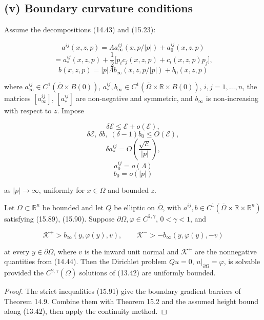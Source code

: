 \medskip

\subsection*{(v) Boundary curvature conditions}
Assume the decompositions (14.43) and (15.23):

\[
a^{ij}(x,z,p)=\Lambda a_\infty^{ij}(x,p/|p|)+a_0^{ij}(x,z,p)
\]
\[
\tag{15.89}
= a_*^{ij}(x,z,p)+\frac12\bigl[p_ic_j(x,z,p)+c_i(x,z,p)p_j\bigr],
\]
\[
b(x,z,p)=|p|\Lambda b_\infty(x,z,p/|p|)+b_0(x,z,p)
\]

\noindent where $a_\infty^{ij}\in C^1(\overline{\Omega}\times B(0))$, $a_*^{ij}, b_\infty\in C^1(\overline{\Omega}\times\mathbb{R}\times B(0))$, $i,j=1,\ldots,n$, the matrices $[a_\infty^{ij}]$, $[a_*^{ij}]$ are non-negative and symmetric, and $b_\infty$ is non-increasing with respect to $z$. Impose

\[
\delta\mathcal{E}\le \mathcal{E}+o(\mathcal{E}),
\]
\[
\delta\mathcal{E},\,\delta b,\;(\delta-1)b_0\le O(\mathcal{E}),
\]
\[
\tag{15.90}
\delta a_*^{ij}=O\!\left(\frac{\sqrt{\mathcal{E}}}{|p|}\right),
\]
\[
a_0^{ij}=o(\Lambda)
\]
\[
b_0=o(|p|)
\]



as \(|p|\to\infty\), uniformly for \(x\in\Omega\) and bounded \(z\).

\medskip

\begin{theorem}\label{gilbarg-trudinger.thm.15.16.strict-boundary-curvature}
Let \(\Omega\subset\mathbb R^n\) be bounded and let \(Q\) be elliptic on
\(\overline\Omega\), with
\(a^{ij},b\in C^1(\overline\Omega\times\mathbb R\times\mathbb R^n)\) satisfying
(15.89), (15.90). Suppose \(\partial\Omega,\varphi\in C^{2,\gamma}\),
\(0<\gamma<1\), and

\[
\tag{15.91}
\mathcal{K}^{+}>b_\infty(y,\varphi(y),v), \qquad \mathcal{K}^{-}>-b_\infty(y,\varphi(y),-v)
\]

at every \(y\in\partial\Omega\), where \(v\) is the inward unit normal and
\(\mathcal K^\pm\) are the nonnegative quantities from (14.44). Then the
Dirichlet problem \(Qu=0\), \(u|_{\partial\Omega}=\varphi\), is solvable
provided the \(C^{2,\gamma}(\overline\Omega)\) solutions of (13.42) are
uniformly bounded.
\end{theorem}
\begin{proof}
\sketch The strict inequalities (15.91) give the boundary gradient barriers
of Theorem 14.9. Combine them with Theorem 15.2 and the assumed height bound
along (13.42), then apply the continuity method.
\end{proof}

